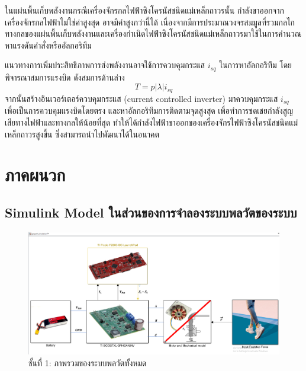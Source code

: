 \documentclass[11pt,a4paper]{article}
\begin{document}
ในแผ่นพื้นเก็บพลังงานกรณีเครื่องจักรกลไฟฟ้าซิงโครนัสชนิดแม่เหล็กถาวรนั้น กำลังขาออกจากเครื่องจักรกลไฟฟ้าไม่ใช่ค่าสูงสุด อาจมีค่าสูงกว่านี้ได้ เนื่องจากมีการประมาณวงจรสมมูลที่รวมกลไกทางกลของแผ่นพื้นเก็บพลังงานและเครื่องกำเนิดไฟฟ้าซิงโครนัสชนิดแม่เหล็กถาวรมาใช้ในการคำนวณหาแรงดันคำสั่งหรืออัลกอริทึม 

แนวทางการเพิ่มประสิทธิภาพการส่งพลังงานอาจใช้การควบคุมกระแส $i_{sq}$ ในการหาอัลกอริทึม โดยพิจารณาสมการแรงบิด ดังสมการด้านล่าง
\begin{equation}
    T = p|\lambda|i_{sq}
\end{equation}
จากนั้นสร้างอินเวอร์เตอร์ควบคุมกระแส (current controlled inverter) มาควบคุมกระแส $i_{sq}$ เพื่อเป็นการควบคุมแรงบิดโดยตรง และหาอัลกอริทึมการติดตามจุดสูงสุด เพื่อทำการชดเชยกำลังสูญเสียทางไฟฟ้าและทางกลให้น้อยที่สุด ทำให้ได้กำลังไฟฟ้าขาออกของเครื่องจักรไฟฟ้าซิงโครนัสชนิดแม่เหล็กถาวรสูงขึ้น ซึ่งสามารถนำไปพัฒนาได้ในอนาคต 





\section{ภาคผนวก}

\subsection{Simulink Model ในส่วนของการจำลองระบบพลวัตของระบบ}

\begin{figure}[H]
    \centering
    \includegraphics[width=\textwidth]{layer0.png}
    \caption{ชั้นที่ 1: ภาพรวมของระบบพลวัตทั้งหมด}
\end{figure}
\end{document}
